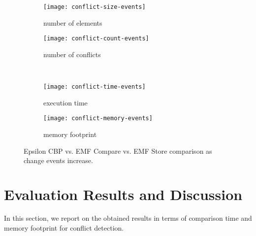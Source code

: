
\begin{figure*}[ht]
  \centering
  \begin{subfigure}[t]{0.495\linewidth}
    \texttt{[image: conflict-size-events]}
    \caption{number of elements}
    \label{fig:conflict-size-events}
  \end{subfigure}
  \hfill
  \begin{subfigure}[t]{0.495\linewidth}
    \texttt{[image: conflict-count-events]}
    \caption{number of conflicts}
    \label{fig:conflict-count-events}
  \end{subfigure}
  \\
  \begin{subfigure}[t]{0.495\linewidth}
    \texttt{[image: conflict-time-events]}
    \caption{execution time}
    \label{fig:conflict-time-events}
  \end{subfigure}
  \hfill
  \begin{subfigure}[t]{0.495\linewidth}
    \texttt{[image: conflict-memory-events]}
    \caption{memory footprint}
    \label{fig:conflict-memory-events}
  \end{subfigure}
  \caption{Epsilon CBP vs. EMF Compare vs. EMF Store comparison as change events increase.}
  \label{fig:conflict_events}
\end{figure*}

\vspace{-5pt}
\section{Evaluation Results and Discussion}
\label{sec:evaluation_discussion}
In this section, we report on the obtained results in terms of comparison time and memory footprint for conflict detection. 

